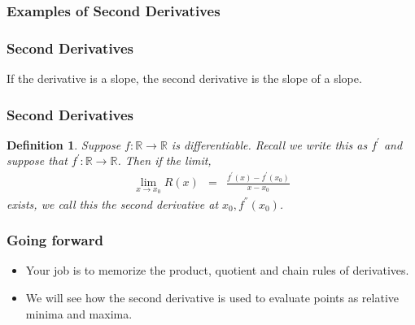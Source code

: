 \documentclass{beamer}
\newtheorem{defn}{Definition}
\numberwithin{equation}{section}
\begin{document}
\begin{frame}
\frametitle{Examples of Second Derivatives}







\end{frame}


\begin{frame}
\frametitle{Second Derivatives}

If the derivative is a slope, the second derivative is the slope of a slope.\pause

\frametitle{Second Derivatives}

\begin{defn} Suppose $f:\mathbb{R} \rightarrow \mathbb{R}$ is differentiable.  Recall we write this as $f^{'}$ and suppose that $f^{'}:\mathbb{R} \rightarrow \mathbb{R}$.  Then if the limit, 
\begin{eqnarray}
\lim_{x\rightarrow x_{0} } R(x) & = & \frac{f^{'}(x) - f^{'}(x_{0} ) } {x - x_{0} } \nonumber 
\end{eqnarray}
exists, we call this the \alert{second derivative} at $x_{0}, f^{''}(x_{0})$.  
\end{defn}

\end{frame}

\begin{frame}
\frametitle{Going forward}
\begin{itemize}
\item Your job is to memorize the product, quotient and chain rules of derivatives.
\item We will see how the second derivative is used to evaluate points as relative minima and maxima.
\end{itemize}
\end{frame}
\end{document}

